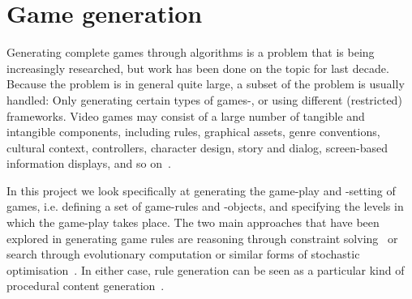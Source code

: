 \documentclass[a4paper,titlepage,final]{report}
\begin{document}
\section{Game generation}
\label{sec_gamegen}
Generating complete games through algorithms is a problem that is being increasingly researched, but work has been done on the topic for last decade. Because the problem is in general quite large, a subset of the problem is usually handled: Only generating certain types of games-, or using different (restricted) frameworks. 
Video games may consist of a large number of tangible and intangible components, including rules, graphical assets, genre conventions, cultural context, controllers, character design, story and dialog, screen-based information displays, and so on~\citet{cook2014angelina,liapis2014creativity,nelson2007automated}.

In this project we look specifically at generating the game-play and -setting of games, i.e. defining a set of game-rules and -objects, and specifying the levels in which the game-play takes place.
The two main approaches that have been explored in generating game rules are reasoning through constraint solving~\citet{smith2010variations} or search through evolutionary computation or similar forms of stochastic optimisation~\citet{togelius2008experiment,browne2008automated,font2013towards}. 
In either case, rule generation can be seen as a particular kind of procedural content generation~\citet{pcgbook:ch6}.


\end{document}
